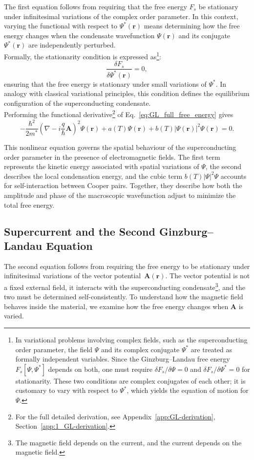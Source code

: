 The first equation follows from requiring that the free energy $F_s$ 
be stationary under infinitesimal variations of the complex order parameter.  
In this context, varying the functional with respect to $\Psi^*(\mathbf r)$ 
means determining how the free energy changes when the condensate wavefunction 
$\Psi(\mathbf r)$ and its conjugate $\Psi^*(\mathbf r)$ are independently perturbed.\\
Formally, the stationarity condition is expressed as\footnote{%
In variational problems involving complex fields, such as the superconducting order parameter, 
the field $\Psi$ and its complex conjugate $\Psi^*$ are treated as formally independent variables. 
Since the Ginzburg--Landau free energy $F_s[\Psi,\Psi^*]$ depends on both, one must require 
$\delta F_s/\delta\Psi = 0$ and $\delta F_s/\delta\Psi^* = 0$ for stationarity. 
These two conditions are complex conjugates of each other; 
it is customary to vary with respect to $\Psi^*$, which yields the equation of motion for $\Psi$.}:
\begin{equation}
\frac{\delta F_s}{\delta \Psi^*(\mathbf{r})} = 0,
\label{eq:GL_variation_Psi}
\end{equation}
ensuring that the free energy is stationary under small variations of $\Psi^*$.  
In analogy with classical variational principles, this condition defines the equilibrium configuration of the superconducting condensate.\\
Performing the functional derivative\footnote{%
For the full detailed derivation, see Appendix~\ref{app:GL-derivation}, 
Section~\ref{app:1_GL-derivation}.} 
of Eq.~\eqref{eq:GL_full_free_energy} gives
\begin{equation}
\boxed{
-\frac{\hbar^2}{2m^*}
\left(\nabla - i\frac{q}{\hbar}\mathbf{A}\right)^{\!2}\Psi(\mathbf{r})
+ a(T)\Psi(\mathbf{r})
+ b(T)|\Psi(\mathbf{r})|^2\Psi(\mathbf{r}) = 0.
}
\label{eq:first_GL_eq}
\end{equation}

This nonlinear equation governs the spatial behaviour of the superconducting order parameter 
in the presence of electromagnetic fields.  
The first term represents the kinetic energy associated with spatial variations of $\Psi$, 
the second describes the local condensation energy, and the cubic term 
$b(T)|\Psi|^2\Psi$ accounts for self-interaction between Cooper pairs.  
Together, they describe how both the amplitude and phase of the macroscopic 
wavefunction adjust to minimize the total free energy.

\subsection*{Supercurrent and the Second Ginzburg--Landau Equation}
The second equation follows from requiring the free energy to be stationary under infinitesimal variations of the vector potential~$\mathbf{A}(\mathbf{r})$.
The vector potential is not a fixed external field, it interacts with the superconducting condensate\footnote{%
The magnetic field depends on the current, and the current depends on the magnetic field.}, and the two must be determined self-consistently.
To understand how the magnetic field behaves inside the material, we examine how the free energy changes when $\mathbf A$ is varied.

